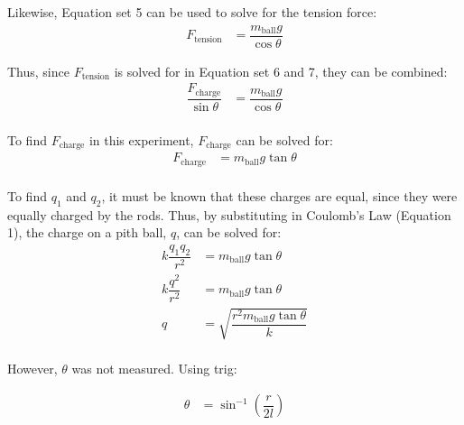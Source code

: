 \documentclass [12pt, letterpaper, twoside]{article}
\begin{document}
\begin{enumerate}
    \noindent
    Likewise, Equation set 5 can be used to solve for the tension force:
    \begin{equation}
      \begin{split}
        F_{\text{tension}} &= \dfrac{m_{\text{ball}}g}{\cos{\theta}}
      \end{split}
    \end{equation}

    \noindent
    Thus, since \(F_{\text{tension}}\) is solved for in Equation set 6 and 7, they can be combined:
    \begin{equation}
      \begin{split}
        \dfrac{F_{\text{charge}}}{\sin{\theta}} &= \dfrac{m_{\text{ball}}g}{\cos{\theta}} \\
      \end{split}
    \end{equation}

    \noindent
    To find \(F_{\text{charge}}\) in this experiment, \(F_{\text{charge}}\) can be solved for:
    \begin{equation}
      \begin{split} 
        F_{\text{charge}} &= m_{\text{ball}}g\tan{\theta} \\
      \end{split}
    \end{equation}

    \noindent
    To find \(q_{1}\) and \(q_{2}\), it must be known that these charges are equal, since they were equally charged by the rods. Thus, by substituting in Coulomb's Law (Equation 1), the charge on a pith ball, \(q\), can be solved for:
    \begin{equation}
      \begin{split}
        k\dfrac{q_{1}q_{2}}{r^2} &= m_{\text{ball}}g\tan{\theta} \\
        k\dfrac{q^2}{r^2} &= m_{\text{ball}}g\tan{\theta} \\
        q &= \sqrt{\dfrac{r^{2}m_{\text{ball}}g\tan{\theta}}{k}} \\
      \end{split}
    \end{equation}

    \noindent
    However, \(\theta\) was not measured. Using trig:

    \begin{equation}
      \begin{split}
        \theta &= \sin^{-1}\left(\dfrac{r}{2l}\right) \\
      \end{split}
    \end{equation}


\end{enumerate}
\end{document}
